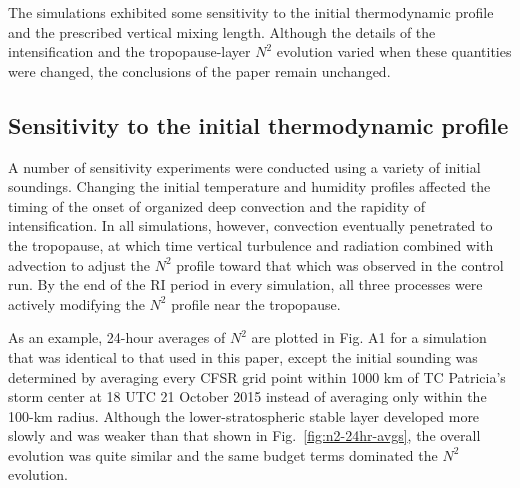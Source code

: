 \documentclass{ametsoc}
\begin{document}
%
\appendix


The simulations exhibited some sensitivity to the initial thermodynamic profile and the prescribed vertical mixing length.
Although the details of the intensification and the tropopause-layer $N^2$ evolution varied when these quantities were changed, the conclusions of the paper remain unchanged.

 \subsection{Sensitivity to the initial thermodynamic profile}
A number of sensitivity experiments were conducted using a variety of initial soundings.
Changing the initial temperature and humidity profiles affected the timing of the onset of organized deep convection and the rapidity of intensification.
In all simulations, however, convection eventually penetrated to the tropopause, at which time vertical turbulence and radiation combined with advection to adjust the $N^2$ profile toward that which was observed in the control run.
By the end of the RI period in every simulation, all three processes were actively modifying the $N^2$ profile near the tropopause.

As an example, 24-hour averages of $N^2$ are plotted in Fig. A1 for a simulation that was identical to that used in this paper, except the initial sounding was determined by averaging every CFSR grid point within 1000 km of TC Patricia's storm center at 18 UTC 21 October 2015 instead of averaging only within the 100-km radius.
Although the lower-stratospheric stable layer developed more slowly and was weaker than that shown in Fig.~\ref{fig:n2-24hr-avgs}, the overall evolution was quite similar and the same budget terms dominated the $N^2$ evolution.
\end{document}
